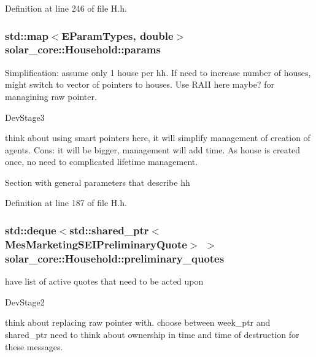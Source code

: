 Definition at line 246 of file H.\+h.

\hypertarget{classsolar__core_1_1_household_a41d61dc3bab971cb19170341b77d9df8}{}
\subsubsection[{params}]{\setlength{\rightskip}{0pt plus 5cm}std\+::map$<${\bf E\+Param\+Types}, double$>$ solar\+\_\+core\+::\+Household\+::params\hspace{0.3cm}{\ttfamily [protected]}}\label{classsolar__core_1_1_household_a41d61dc3bab971cb19170341b77d9df8}
Simplification\+: assume only 1 house per hh. If need to increase number of houses, might switch to vector of pointers to houses. Use R\+A\+I\+I here maybe? for managining raw pointer.\begin{DoxyRefDesc}{Dev\+Stage3}
\item[\hyperlink{_dev_stage3__DevStage3000003}{Dev\+Stage3}]think about using smart pointers here, it will simplify management of creation of agents. Cons\+: it will be bigger, management will add time. As house is created once, no need to complicated lifetime management. \end{DoxyRefDesc}


Section with general parameters that describe hh 

Definition at line 187 of file H.\+h.

\hypertarget{classsolar__core_1_1_household_a297842358a2d79db160566106972bc0d}{}
\subsubsection[{preliminary\+\_\+quotes}]{\setlength{\rightskip}{0pt plus 5cm}std\+::deque$<$std\+::shared\+\_\+ptr$<${\bf Mes\+Marketing\+S\+E\+I\+Preliminary\+Quote}$>$ $>$ solar\+\_\+core\+::\+Household\+::preliminary\+\_\+quotes\hspace{0.3cm}{\ttfamily [protected]}}\label{classsolar__core_1_1_household_a297842358a2d79db160566106972bc0d}
have list of active quotes that need to be acted upon\begin{DoxyRefDesc}{Dev\+Stage2}
\item[\hyperlink{_dev_stage2__DevStage2000008}{Dev\+Stage2}]think about replacing raw pointer with.  choose between week\+\_\+ptr and shared\+\_\+ptr need to think about ownership in time and time of destruction for these messages. \end{DoxyRefDesc}


